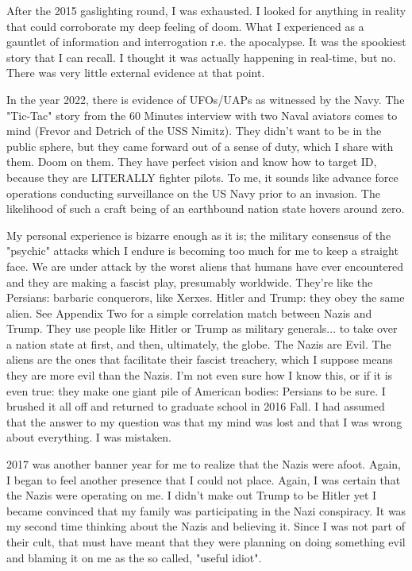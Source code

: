 \documentclass{article}
\begin{document}
\begin{multicols}{2}
After the 2015 gaslighting round, I was exhausted. I looked for anything in reality that could corroborate my deep feeling of doom. What I experienced as a gauntlet of information and interrogation r.e. the apocalypse. It was the spookiest story that I can recall. I thought it was actually happening in real-time, but no. There was very little external evidence at that point. 

In the year 2022, there is evidence of UFOs/UAPs as witnessed by the Navy. The "Tic-Tac" story from the 60 Minutes interview with two Naval aviators comes to mind (Frevor and Detrich of the USS Nimitz). They didn't want to be in the public sphere, but they came forward out of a sense of duty, which I share with them. Doom on them. They have perfect vision and know how to target ID, because they are LITERALLY fighter pilots. To me, it sounds like advance force operations conducting surveillance on the US Navy prior to an invasion. The likelihood of such a craft being of an earthbound nation state hovers around zero. 

My personal experience is bizarre enough as it is; the military consensus of the "psychic" attacks which I endure is becoming too much for me to keep a straight face. We are under attack by the worst aliens that humans have ever encountered and they are making a fascist play, presumably worldwide. They're like the Persians: barbaric conquerors, like Xerxes. Hitler and Trump: they obey the same alien. See Appendix Two for a simple correlation match between Nazis and Trump. They use people like Hitler or Trump as military generals... to take over a nation state at first, and then, ultimately, the globe. The Nazis are Evil. The aliens are the ones that facilitate their fascist treachery, which I suppose means they are more evil than the Nazis. I'm not even sure how I know this, or if it is even true: they make one giant pile of American bodies: Persians to be sure. I brushed it all off and returned to graduate school in 2016 Fall. I had assumed that the answer to my question was that my mind was lost and that I was wrong about everything. I was mistaken. 

2017 was another banner year for me to realize that the Nazis were afoot. Again, I began to feel another presence that I could not place. Again, I was certain that the Nazis were operating on me. I didn't make out Trump to be Hitler yet I became convinced that my family was participating in the Nazi conspiracy. It was my second time thinking about the Nazis and believing it. Since I was not part of their cult, that must have meant that they were planning on doing something evil and blaming it on me as the so called, "useful idiot". 


\end{multicols}
\end{document}
